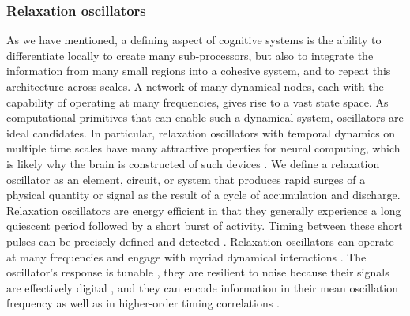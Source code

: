 \documentclass[twocolumn]{article}
\begin{document}
\subsubsection{Relaxation oscillators}
As we have mentioned, a defining aspect of cognitive systems is the ability to differentiate locally to create many sub-processors, but also to integrate the information from many small regions into a cohesive system, and to repeat this architecture across scales. A network of many dynamical nodes, each with the capability of operating at many frequencies, gives rise to a vast state space. As computational primitives that can enable such a dynamical system, oscillators are ideal candidates. In particular, relaxation oscillators \cite{st2015,mist1990,soko1993,lued1997,huya2000,bu2006,gile2011,vepe1968,cacl1981} with temporal dynamics on multiple time scales \cite{soko1993} have many attractive properties for neural computing, which is likely why the brain is constructed of such devices \cite{ll1988}. We define a relaxation oscillator as an element, circuit, or system that produces rapid surges of a physical quantity or signal as the result of a cycle of accumulation and discharge. Relaxation oscillators are energy efficient in that they generally experience a long quiescent period followed by a short burst of activity. Timing between these short pulses can be precisely defined and detected \cite{bu2006}. Relaxation oscillators can operate at many frequencies \cite{huya2000} and engage with myriad dynamical interactions \cite{lued1997}. The oscillator's response is tunable \cite{huya2000}, they are resilient to noise because their signals are effectively digital \cite{stgo2005}, and they can encode information in their mean oscillation frequency as well as in higher-order timing correlations \cite{pasc1999,thde2001,sase2001,stse2007,brcl2010,haah2015}.
\end{document}
